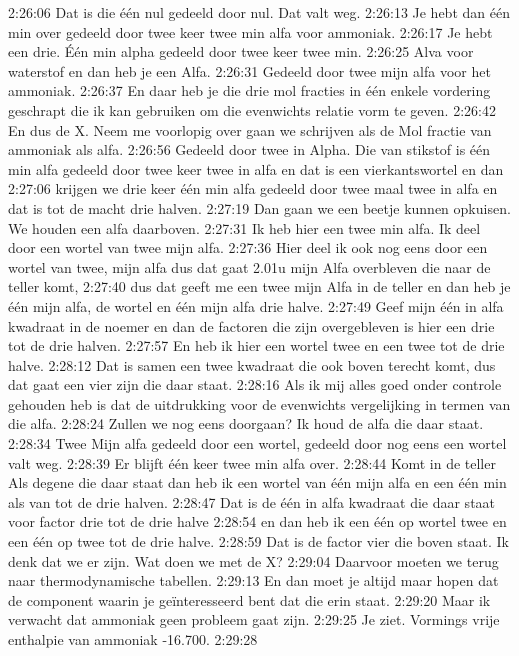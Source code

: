 2:26:06
Dat is die één nul gedeeld door nul. Dat valt weg.
2:26:13
Je hebt dan één min over gedeeld door twee keer twee min alfa voor ammoniak.
2:26:17
Je hebt een drie. Één min alpha gedeeld door twee keer twee min.
2:26:25
Alva voor waterstof en dan heb je een Alfa.
2:26:31
Gedeeld door twee mijn alfa voor het ammoniak.
2:26:37
En daar heb je die drie mol fracties in één enkele vordering geschrapt die ik kan gebruiken om die evenwichts relatie vorm te geven.
2:26:42
En dus de X. Neem me voorlopig over gaan we schrijven als de Mol fractie van ammoniak als alfa.
2:26:56
Gedeeld door twee in Alpha. Die van stikstof is één min alfa gedeeld door twee keer twee in alfa en dat is een vierkantswortel en dan
2:27:06
krijgen we drie keer één min alfa gedeeld door twee maal twee in alfa en dat is tot de macht drie halven.
2:27:19
Dan gaan we een beetje kunnen opkuisen. We houden een alfa daarboven.
2:27:31
Ik heb hier een twee min alfa. Ik deel door een wortel van twee mijn alfa.
2:27:36
Hier deel ik ook nog eens door een wortel van twee, mijn alfa dus dat gaat 2.01u mijn Alfa overbleven die naar de teller komt,
2:27:40
dus dat geeft me een twee mijn Alfa in de teller en dan heb je één mijn alfa, de wortel en één mijn alfa drie halve.
2:27:49
Geef mijn één in alfa kwadraat in de noemer en dan de factoren die zijn overgebleven is hier een drie tot de drie halven.
2:27:57
En heb ik hier een wortel twee en een twee tot de drie halve.
2:28:12
Dat is samen een twee kwadraat die ook boven terecht komt, dus dat gaat een vier zijn die daar staat.
2:28:16
Als ik mij alles goed onder controle gehouden heb is dat de uitdrukking voor de evenwichts vergelijking in termen van die alfa.
2:28:24
Zullen we nog eens doorgaan? Ik houd de alfa die daar staat.
2:28:34
Twee Mijn alfa gedeeld door een wortel, gedeeld door nog eens een wortel valt weg.
2:28:39
Er blijft één keer twee min alfa over.
2:28:44
Komt in de teller Als degene die daar staat dan heb ik een wortel van één mijn alfa en een één min als van tot de drie halven.
2:28:47
Dat is de één in alfa kwadraat die daar staat voor factor drie tot de drie halve
2:28:54
en dan heb ik een één op wortel twee en een één op twee tot de drie halve.
2:28:59
Dat is de factor vier die boven staat. Ik denk dat we er zijn. Wat doen we met de X?
2:29:04
Daarvoor moeten we terug naar thermodynamische tabellen.
2:29:13
En dan moet je altijd maar hopen dat de component waarin je geïnteresseerd bent dat die erin staat.
2:29:20
Maar ik verwacht dat ammoniak geen probleem gaat zijn.
2:29:25
Je ziet. Vormings vrije enthalpie van ammoniak -16.700.
2:29:28
